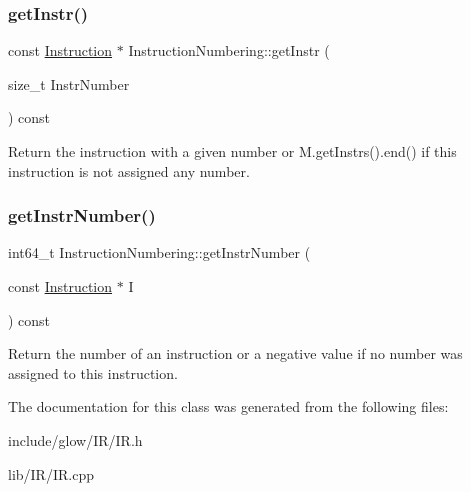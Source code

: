 \subsubsection{\texorpdfstring{get\+Instr()}{getInstr()}}
{\footnotesize\ttfamily const \hyperlink{classglow_1_1_instruction}{Instruction} $\ast$ Instruction\+Numbering\+::get\+Instr (\begin{DoxyParamCaption}\item[{size\+\_\+t}]{Instr\+Number }\end{DoxyParamCaption}) const}

Return the instruction with a given number or M.\+get\+Instrs().end() if this instruction is not assigned any number. \mbox{\label{classglow_1_1_instruction_numbering_a7e2781897999a53f1181b2410c614ecc}} 
\subsubsection{\texorpdfstring{get\+Instr\+Number()}{getInstrNumber()}}
{\footnotesize\ttfamily int64\+\_\+t Instruction\+Numbering\+::get\+Instr\+Number (\begin{DoxyParamCaption}\item[{const \hyperlink{classglow_1_1_instruction}{Instruction} $\ast$}]{I }\end{DoxyParamCaption}) const}

Return the number of an instruction or a negative value if no number was assigned to this instruction. 

The documentation for this class was generated from the following files\+:\begin{DoxyCompactItemize}
\item 
include/glow/\+I\+R/I\+R.\+h\item 
lib/\+I\+R/I\+R.\+cpp\end{DoxyCompactItemize}
